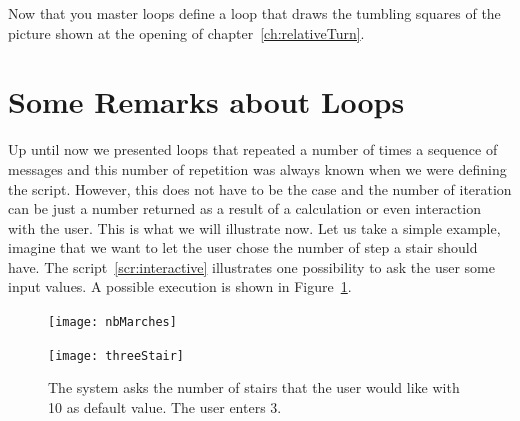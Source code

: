 

\begin{exonofig}
Now that you master loops define a loop that draws the tumbling squares of the picture shown at the opening of chapter~\ref{ch:relativeTurn}.
\end{exonofig}


\section{Some Remarks about Loops}
Up until now we presented loops that repeated a number of times
a sequence of messages and this number of repetition was always known when we were defining the script. However, this does not have to be the case and the number of iteration can be just a number returned as a result of a calculation or even interaction with the user. This is what we will illustrate now.
Let us take a simple example, imagine that we want to let the user chose the number of step a stair should have. The script~\ref{scr:interactive} illustrates one possibility to ask the user some input values. A possible execution is shown in Figure~\ref{fig:usertroismarches}.




\begin{figure}[!htbp]
\begin{minipage}[b]{.5\linewidth}
\centerline{\texttt{[image: nbMarches]}}
\end{minipage}
\begin{minipage}[b]{.5\linewidth}
\centerline{\texttt{[image: threeStair]}}
\end{minipage}
\caption{The system asks the number of stairs that the user would like with 10 as default value. The user enters 3.}
\label{fig:usertroismarches}
\end{figure}


